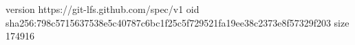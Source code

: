 version https://git-lfs.github.com/spec/v1
oid sha256:798c5715637538e5c40787c6bc1f25c5f729521fa19ee38c2373e8f57329f203
size 174916
